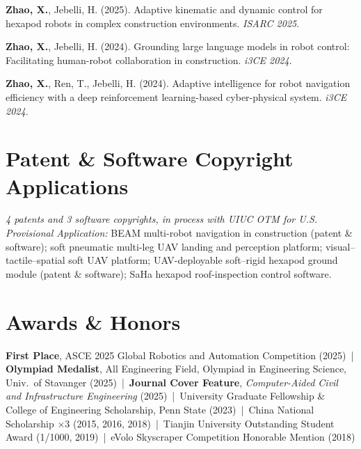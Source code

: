 \documentclass[10pt,a4paper]{article}
\newcommand{\me}{\textbf{Zhao, X.}}
\begin{document}
{\begin{enumerate}[leftmargin=1.5em, label={[\arabic*]}]
\item \me, Jebelli, H. (2025). Adaptive kinematic and dynamic control for hexapod robots in complex construction environments. \textit{ISARC 2025}.
\item \me, Jebelli, H. (2024). Grounding large language models in robot control: Facilitating human-robot collaboration in construction. \textit{i3CE 2024}.
\item \me, Ren, T., Jebelli, H. (2024). Adaptive intelligence for robot navigation efficiency with a deep reinforcement learning-based cyber-physical system. \textit{i3CE 2024}.
\end{enumerate}}

\section{Patent \& Software Copyright Applications}
\textit{4 patents and 3 software copyrights, in process with UIUC OTM for U.S. Provisional Application:} BEAM multi-robot navigation in construction (patent \& software); soft pneumatic multi-leg UAV landing and perception platform; visual--tactile--spatial soft UAV platform; UAV-deployable soft--rigid hexapod ground module (patent \& software); SaHa hexapod roof-inspection control software.\par

\section{Awards \& Honors}
\textbf{First Place}, ASCE 2025 Global Robotics and Automation Competition (2025) \,|\, \textbf{Olympiad Medalist}, All Engineering Field, Olympiad in Engineering Science, Univ.\ of Stavanger (2025) \,|\, \textbf{Journal Cover Feature}, \textit{Computer-Aided Civil and Infrastructure Engineering} (2025) \,|\, University Graduate Fellowship \& College of Engineering Scholarship, Penn State (2023) \,|\, China National Scholarship $\times$3 (2015, 2016, 2018) \,|\, Tianjin University Outstanding Student Award (1/1000, 2019) \,|\, eVolo Skyscraper Competition Honorable Mention (2018)\par

\end{document}
